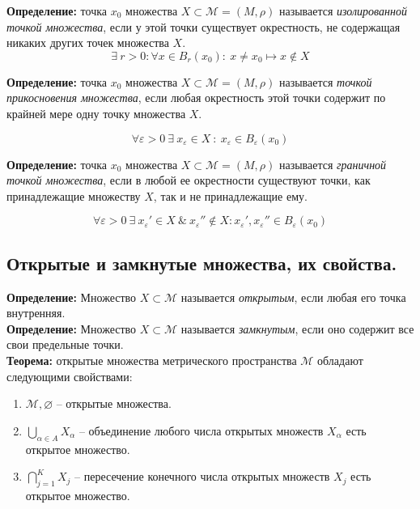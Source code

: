 \documentclass[a4paper,12pt]{article} %
\begin{document}
\noindent \textbf{Определение:} точка $x_0$ множества $X \subset \mathscr{M} = (M, \rho)$ называется \textit{изолированной точкой множества}, если у этой точки существует окрестность, не содержащая никаких других точек множества $X$.
\[ \exists ~ r > 0 : \forall x \in B_r(x_0) : ~ x \neq x_0 \mapsto x \notin X \]

\noindent \textbf{Определение:} точка $x_0$ множества $X \subset \mathscr{M} = (M, \rho)$ называется \textit{точкой прикосновения множества}, если любая окрестность этой точки содержит по крайней мере одну точку множества $X$.

\[ \forall \varepsilon > 0 ~ \exists ~ x_{\varepsilon} \in X ~ : ~ x_{\varepsilon} \in B_{\varepsilon}(x_0) \]

\noindent \textbf{Определение:} точка $x_0$ множества $X \subset \mathscr{M} = (M, \rho)$ называется \textit{граничной точкой множества}, если в любой ее окрестности существуют точки, как принадлежащие множеству $X$, так и не принадлежащие ему.

\[ \forall \varepsilon > 0 ~ \exists ~ x_{\varepsilon}' \in X ~ \& ~ x_{\varepsilon}'' \notin X : x_{\varepsilon}', x_{\varepsilon}'' \in B_{\varepsilon}(x_0) \]

\subsection*{Открытые и замкнутые множества, их свойства.}

\noindent \textbf{Определение:} Множество $X \subset \mathscr{M}$ называется \textit{открытым}, если любая его точка внутренняя.\\

\noindent \textbf{Определение:} Множество $X \subset \mathscr{M}$ называется \textit{замкнутым}, если оно содержит все свои предельные точки.\\

\noindent \textbf{Теорема:} открытые множества метрического пространства $\mathscr{M}$ обладают следующими свойствами:

\begin{enumerate}
    \item $\mathscr{M}, \varnothing$ -- открытые множества.
    \item $\bigcup \limits_{\alpha \in A} X_{\alpha}$ -- объединение любого числа открытых множеств $X_{\alpha}$ есть открытое множество.
    \item $\bigcap \limits_{j = 1}^K X_j$ -- пересечение конечного числа открытых множеств $X_j$ есть открытое множество.
\end{enumerate}
\end{document}
